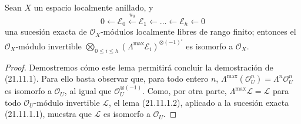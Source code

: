 \begin{lemma}[21.11.1.2]
\label{IV.21.11.1.2}
Sean $X$ un espacio localmente anillado, y
\[
  0\leftarrow\mathscr E_0\xleftarrow{u_0}\mathscr E_1
  \leftarrow\ldots\leftarrow\mathscr E_h\leftarrow0
\]
una sucesión exacta de $\mathcal O_X$-módulos localmente libres de rango finito; entonces el
$\mathcal O_X$-módulo invertible
$\bigotimes_{0\leq i\leq h}(\Lambda^{\max}\mathscr E_i)^{\otimes(-1)^i}$
es isomorfo a $\mathcal O_X$.
\end{lemma}

\begin{proof}
Demostremos cómo este lema permitirá concluir la demostración de (21.11.1). Para ello basta
observar que, para todo entero $n$,
$\Lambda^{\max}(\mathcal O_U^n)=\Lambda^n\mathcal O_U^n$ es isomorfo a
$\mathcal O_U$, al igual que $\mathcal O_U^{\otimes(-1)}$. Como, por otra parte,
$\Lambda^{\max}\mathscr L=\mathscr L$ para todo $\mathcal O_U$-módulo invertible
$\mathscr L$, el lema (21.11.1.2), aplicado a la sucesión exacta (21.11.1.1), muestra
que $\mathscr L$ es isomorfo a $\mathcal O_U$.


\end{proof}

